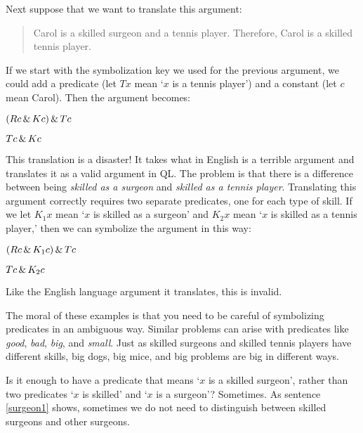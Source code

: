 Next suppose that we want to translate this argument:
\begin{quote}
\label{surgeon3}
Carol is a skilled surgeon and a tennis player. Therefore, Carol is a skilled tennis player.
\end{quote}
If we start with the symbolization key we used for the previous argument, we could add a predicate (let $Tx$ mean `$x$ is a tennis player') and a constant (let $c$ mean Carol). Then the argument becomes:
\begin{earg}
\item[] $(Rc \,\&\, Kc) \,\&\, Tc$
\item[\therefore] $Tc \,\&\, Kc$
\end{earg}
This translation is a disaster! It takes what in English is a terrible argument and translates it as a valid argument in QL. The problem is that there is a difference between being \emph{skilled as a surgeon} and \emph{skilled as a tennis player}. Translating this argument correctly requires two separate predicates, one for each type of skill. If we let $K_1x$ mean `$x$ is skilled as a surgeon' and $K_2x$ mean `$x$ is skilled as a tennis player,' then we can symbolize the argument in this way:
\begin{earg}
\label{surgeon3correct}
\item[] $(Rc \,\&\, K_1c) \,\&\, Tc$
\item[\therefore] $Tc \,\&\, K_2c$
\end{earg}
Like the English language argument it translates, this is invalid. %

The moral of these examples is that you need to be careful of symbolizing predicates in an ambiguous way. Similar problems can arise with predicates like \emph{good}, \emph{bad}, \emph{big}, and \emph{small}. Just as skilled surgeons and skilled tennis players have different skills, big dogs, big mice, and big problems are big in different ways.

Is it enough to have a predicate that means `$x$ is a skilled surgeon', rather than two predicates `$x$ is skilled' and `$x$ is a surgeon'? Sometimes. As sentence \ref{surgeon1} shows, sometimes we do not need to distinguish between skilled surgeons and other surgeons.

